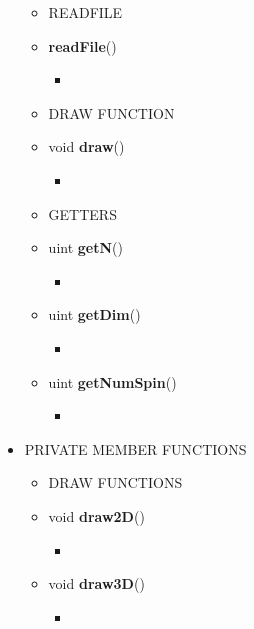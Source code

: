 \documentclass[11pt,a4paper]{article}
\begin{document}
\begin{itemize}
\begin{itemize}
		\item[] READFILE \\

			\item[] \textbf{readFile}()		 
			\begin{itemize}
				\item[] 
			\end{itemize}
		
		\item[] DRAW FUNCTION \\
		
			\item[] void \textbf{draw}()		 
			\begin{itemize}
				\item[] 
			\end{itemize}

		\item[]	GETTERS \\		
		
			\item[] uint \textbf{getN}()		 
			\begin{itemize}
				\item[] 
			\end{itemize}
			
			\item[] uint \textbf{getDim}() 		 
			\begin{itemize}
				\item[] 
			\end{itemize}
			
			\item[] uint \textbf{getNumSpin}() 		 
			\begin{itemize}
				\item[] 
			\end{itemize}
	\end{itemize}
	
	\item[] PRIVATE MEMBER FUNCTIONS \\ 
	\begin{itemize}
			
		\item[] DRAW FUNCTIONS
			\item[] void \textbf{draw2D}()		 
			\begin{itemize}
				\item[] 
			\end{itemize}
			
			\item[] void \textbf{draw3D}()  		 
			\begin{itemize}
				\item[] 
			\end{itemize}
			

\end{itemize}
\end{itemize}
\end{document}

